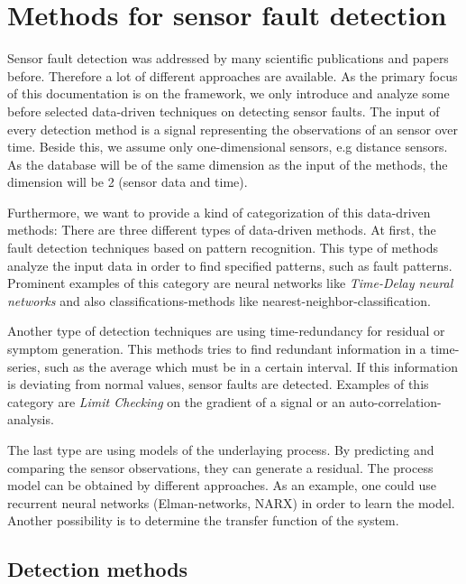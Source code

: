 \documentclass[a4paper,11pt]{article}
\begin{document}
\section{Methods for sensor fault detection}

Sensor fault detection was addressed by many scientific publications and papers before. Therefore a lot of different approaches are available. As the primary focus of this documentation is on the framework, we only introduce and analyze some before selected data-driven techniques on detecting sensor faults. The input of every detection method is a signal representing the observations of an sensor over time. Beside this, we assume only one-dimensional sensors, e.g distance sensors. As the database will be of the same dimension as the input of the methods, the dimension will be 2 (sensor data and time). 

Furthermore, we want to provide a kind of categorization of this data-driven methods: 
There are three different types of data-driven methods. At first, the fault detection techniques based on pattern recognition. This type of methods analyze the input data in order to find specified patterns, such as fault patterns. Prominent examples of this category are neural networks like \textit{Time-Delay neural networks} and also classifications-methods like nearest-neighbor-classification.

Another type of detection techniques are using time-redundancy for residual or symptom generation. This methods tries to find redundant information in a time-series, such as the average which must be in a certain interval. If this information is deviating from normal values, sensor faults are detected. Examples of this category are \textit{Limit Checking} on the gradient of a signal or an auto-correlation-analysis.

The last type are using models of the underlaying process. By predicting and comparing the sensor observations, they can generate a residual. The process model can be obtained by different approaches. As an example, one could use recurrent neural networks (Elman-networks, NARX) in order to \glqq learn \grqq the model. Another possibility is to determine the transfer function of the system.

\subsection{Detection methods}
\end{document}
